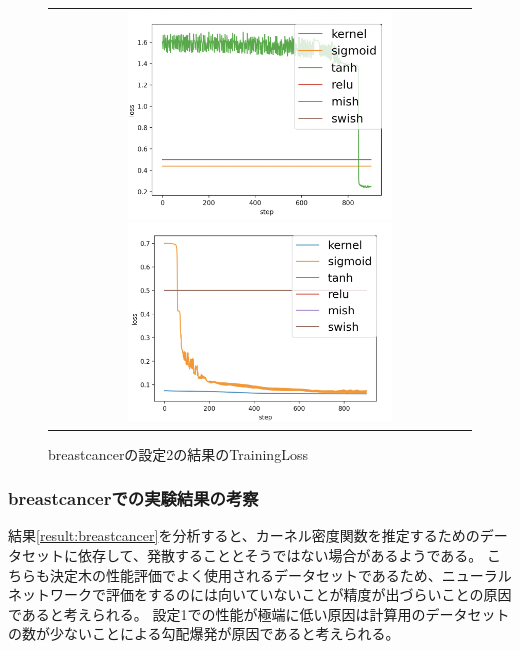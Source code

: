 \begin{figure}[hbtp]
    \begin{center}
        \begin{tabular}{c}
            \begin{minipage}{0.5\hsize}
                \includegraphics[clip, width=7cm]{asset/breastcancer_0.001_1000_3_005_sgd_non_kaiming_uniform}
                    \caption{breastcancerの設定1の結果のTrainingLoss}
                    \label{breastcancer:loss_image1}
            \end{minipage}
            \hspace{10pt}
            \begin{minipage}{0.5\hsize}
                \includegraphics[clip, width=7cm]{asset/breastcancer_0.001_1000_3_05_sgd_non_kaiming_uniform}
                    \caption{breastcancerの設定2の結果のTrainingLoss}
                    \label{breastcancer:loss_image2}
            \end{minipage}
        \end{tabular}
    \end{center}
\end{figure}


\subsubsection{breastcancerでの実験結果の考察}
結果\ref{result:breastcancer}を分析すると、カーネル密度関数を推定するためのデータセットに依存して、発散することとそうではない場合があるようである。
こちらも決定木の性能評価でよく使用されるデータセットであるため、ニューラルネットワークで評価をするのには向いていないことが精度が出づらいことの原因であると考えられる。
設定1での性能が極端に低い原因は計算用のデータセットの数が少ないことによる勾配爆発が原因であると考えられる。

